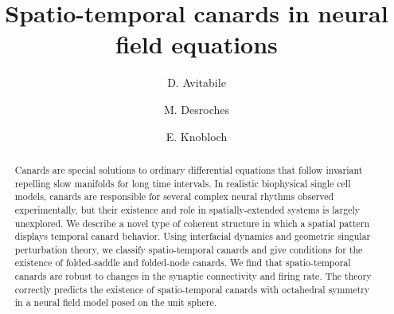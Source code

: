 \documentclass[aps,prl,reprint,superscriptaddress]{revtex4-1}
\begin{document}
\title{Spatio-temporal canards in neural field equations}%

\author{D. Avitabile}

\author{M. Desroches}

\author{E. Knobloch}

\begin{abstract}
  Canards are special solutions to ordinary differential equations
  that follow invariant repelling slow manifolds for long time intervals. In
  realistic biophysical single cell models, canards are responsible for several
  complex neural rhythms observed experimentally, 
  but their existence and role in spatially-extended systems is largely unexplored. We
  describe a novel type of coherent structure in which a
  spatial pattern displays temporal canard behavior. Using interfacial dynamics
  and geometric singular perturbation theory, we classify spatio-temporal canards
  and give conditions for the existence of folded-saddle and folded-node canards. We
  find that spatio-temporal canards are robust to changes in the synaptic
  connectivity and firing rate. The theory correctly predicts the existence of
  spatio-temporal canards with octahedral symmetry in a neural field model posed
  on the unit sphere.
%
\end{abstract}

\pacs{}%
\maketitle
\end{document}

